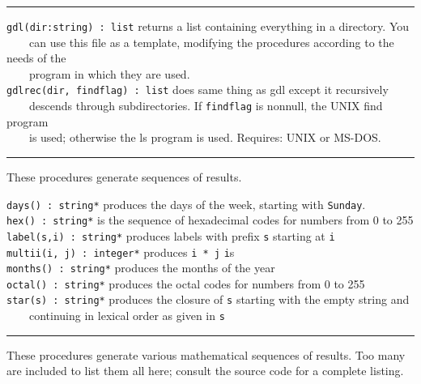 \vspace{0.25cm}\hrule{}

\texttt{gdl(dir:string) : list} returns a list containing everything in
a directory. You\\
 \ \ \ \ can use this file as a template, modifying the procedures
according to the needs of the\\
 \ \ \ \ program in which they are used.\\
\texttt{gdlrec(dir, findflag) : list} does same thing as gdl except it
recursively\\
 \ \ \ \ descends through subdirectories. If \texttt{findflag} is
nonnull, the UNIX {\textquotedbl}find{\textquotedbl} program\\
 \ \ \ \ is used; otherwise the {\textquotedbl}ls{\textquotedbl} program
is used. Requires: UNIX or MS-DOS.

\vspace{0.25cm}\hrule{}

These procedures generate sequences of results. 

\texttt{days() : string*} produces the days of
the week, starting with
\texttt{{\textquotedbl}Sunday{\textquotedbl}}.\\
\texttt{hex() : string*} is the sequence of
hexadecimal codes for numbers from 0 to 255\\
\texttt{label(s,i) : string*} produces labels with prefix \texttt{s}
starting at \texttt{i}\\
\texttt{multii(i, j) : integer*} produces \texttt{i * j}
\texttt{i}{\textquotesingle}s\\
\texttt{months() : string*} produces the months of the year\\
\texttt{octal() : string*} produces the octal codes for
numbers from 0 to 255\\
\texttt{star(s) : string*} produces the closure of \texttt{s} starting with the
empty string and\\
 \ \ \ \ continuing in lexical order as given in \texttt{s} 

\vspace{0.25cm}\hrule{}

These procedures generate various mathematical
sequences of results. Too many are included to list
them all here; consult the source code for a complete listing.

